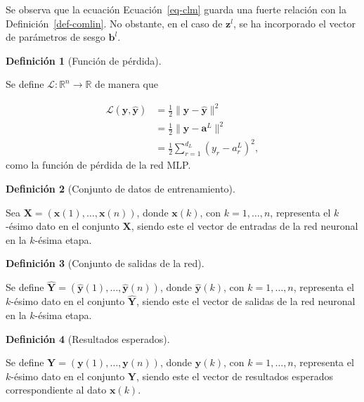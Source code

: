 \documentclass[
  us-letterpaper,
]{scrreprt}
\theoremstyle{definition}
\theoremstyle{plain}
\theoremstyle{plain}
\theoremstyle{definition}
\newtheorem{definition}{Definición}[chapter]
\theoremstyle{remark}
\begin{document}
Se observa que la ecuación Ecuación~\ref{eq-clm} guarda una fuerte
relación con la Definición~\ref{def-comlin}. No obstante, en el caso de
\(\mathbf{z}^l\), se ha incorporado el vector de parámetros de sesgo
\(\mathbf{b}^l\).

\begin{definition}[Función de
pérdida]\protect\hypertarget{def-fperdida}{}\label{def-fperdida}

Se define \(\mathcal L: \mathbb{R}^n \rightarrow \mathbb{R}\) de manera
que

\[\begin{split}\mathcal L(\mathbf y,\mathbf{\hat{y}}) &= \frac{1}{2}\|\mathbf y - \mathbf{\hat{y}}\|^2\\ &= \frac{1}{2} \|\mathbf y - \mathbf a^L\|^2\\ &= \frac{1}{2} \sum_{r=1}^{d_L} (y_r - a_r^L)^2,\end{split}\]
como la función de pérdida de la red MLP.

\end{definition}

\begin{definition}[Conjunto de datos de
entrenamiento]\protect\hypertarget{def-cde}{}\label{def-cde}

Sea \(\mathbf X = (\mathbf x(1), \ldots, \mathbf x(n))\), donde
\(\mathbf x(k)\), con \(k = 1, \ldots, n\), representa el \(k\)-ésimo
dato en el conjunto \(\mathbf X\), siendo este el vector de entradas de
la red neuronal en la \(k\)-ésima etapa.

\end{definition}

\begin{definition}[Conjunto de salidas de la
red]\protect\hypertarget{def-csr}{}\label{def-csr}

Se define
\(\hat{\mathbf Y} = (\hat{\mathbf y}(1), \ldots, \hat{\mathbf y}(n))\),
donde \(\hat{\mathbf y}(k)\), con \(k = 1, \ldots, n\), representa el
\(k\)-ésimo dato en el conjunto \(\hat{\mathbf Y}\), siendo este el
vector de salidas de la red neuronal en la \(k\)-ésima etapa.

\end{definition}

\begin{definition}[Resultados
esperados]\protect\hypertarget{def-re}{}\label{def-re}

Se define \(\mathbf Y = (\mathbf y(1), \ldots, \mathbf y(n))\), donde
\(\mathbf y(k)\), con \(k = 1, \ldots, n\), representa el \(k\)-ésimo
dato en el conjunto \(\mathbf Y\), siendo este el vector de resultados
esperados correspondiente al dato \(\mathbf x(k)\).

\end{definition}
\end{document}
